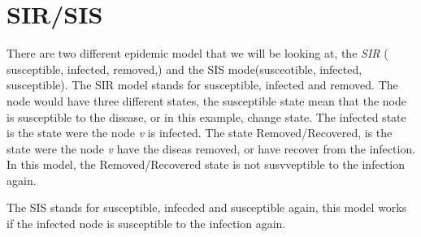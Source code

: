 \section{SIR/SIS}
There are two different epidemic model that we will be looking at, the {\it SIR} ( susceptible, infected, removed,) and the SIS mode(susceotible, infected, susceptible). The SIR model stands for susceptible, infected and removed. The node would have three different states, the susceptible state mean that the node is susceptible to the disease, or in this example, change state. The infected state is the state were the node {\it v} is infected. The state Removed/Recovered, is the state were the node {\it v} have the diseas removed, or have recover from the infection. In this model, the Removed/Recovered state is not susvveptible to the infection again. 

The SIS stands for susceptible, infecded and susceptible again, this model works if the infected node is susceptible to the infection again. 